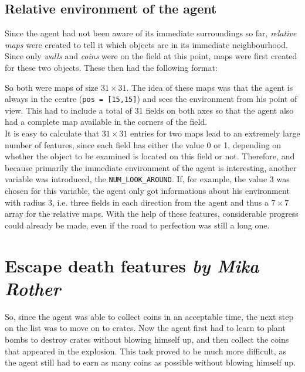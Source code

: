 \subsection{Relative environment of the agent}
Since the agent had not been aware of its immediate surroundings so far, \textit{relative maps} were created to tell it which objects are in its immediate neighbourhood. Since only \textit{walls} and \textit{coins} were on the field at this point, maps were first created for these two objects. These then had the following format:
\vspace{0.1cm}

\vspace{0.1cm}
So both were maps of size $31\times 31$. The idea of these maps was that the agent is always in the centre (\texttt{pos = [15,15]}) and sees the environment from his point of view. This had to include a total of 31 fields on both axes so that the agent also had a complete map available in the corners of the field.
\\

It is easy to calculate that $31\times 31$ entries for two maps lead to an extremely large number of features, since each field has either the value 0 or 1, depending on whether the object to be examined is located on this field or not. Therefore, and because primarily the immediate environment of the agent is interesting, another variable was introduced, the \texttt{NUM\_LOOK\_AROUND}. If, for example, the value 3 was chosen for this variable, the agent only got informations about his environment with radius 3, i.e. three fields in each direction from the agent and thus a $7\times 7$ array for the relative maps. With the help of these features, considerable progress could already be made, even if the road to perfection was still a long one.

\section[Escape death features]{Escape death features \hfill \small \normalfont\textit{by Mika Rother}}
So, since the agent was able to collect coins in an acceptable time, the next step on the list was to move on to crates. Now the agent first had to learn to plant bombs to destroy crates without blowing himself up, and then collect the coins that appeared in the explosion. This task proved to be much more difficult, as the agent still had to earn as many coins as possible without blowing himself up. 

